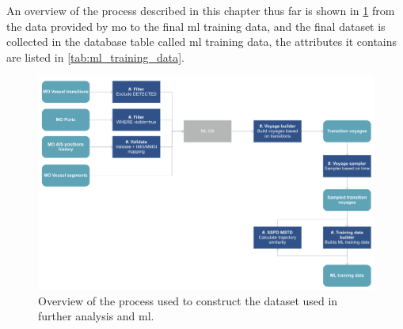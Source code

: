 An overview of the process described in this chapter thus far is shown in \cref{fig:dataset_overview} from the data provided by \acrfull{mo} to the final \acrshort{ml} training data, and the final dataset is collected in the database table called \acrshort{ml} training data, the attributes it contains are listed in \cref{tab:ml_training_data}.

\begin{figure}[htbp]  %
    \centering
    \includegraphics[width=1.0\textwidth]{figures/dataset_overview}
    \caption{Overview of the process used to construct the dataset used in further analysis and \acrshort{ml}.}
    \label{fig:dataset_overview}
\end{figure}

